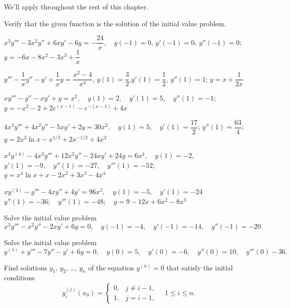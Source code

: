 We'll apply  
throughout the rest of this chapter.

\exercises

\begin{exerciselist}

\item\label{exer:9.1.1}Verify that the given function is the solution of the initial
value problem.

\begin{alist}
\item $ x^3y'''-3x^2y''+6xy'-6y=-\dfrac{24}{x}, \quad  y(-1)=0$,
$y'(-1)=0$, \quad  $y''(-1)=0$; $y=-6x-8x^2-3x^3+\dfrac{1}{x}$
\item $y'''-\dfrac{1}{x}y''-y'+\dfrac{1}{x}y=\dfrac{x^2-4}{x^4}$, \quad
$y(1)=\dfrac{3}{2}$,\quad $y'(1)=\dfrac{1}{2}$, $ y''(1)=1$;
$y=x+\dfrac{1}{2x}$
\item $xy'''-y''-xy'+y=x^2, \quad  y(1)=2,\quad y'(1)=5,\quad y''(1)=-1$;
$y=-x^2-2+2e^{(x-1)}-e^{-(x-1)}+4x$
\item $4x^3y'''+4x^2y''-5xy'+2y=30x^2, \quad
y(1)=5,\quad y'(1)=\dfrac{17}{2}$;
$y''(1)=\dfrac{63}{4}$;\quad $y=2x^2\ln x-x^{1/2}+2x^{-1/2}+4x^2$
\item $x^4y^{(4)}-4x^3y'''+12x^2y''-24xy'+24y=6x^4, \quad  y(1)=-2$,
$y'(1)=-9, \quad  y''(1)=-27,\quad y'''(1)=-52$;
$y=x^4\ln x+x-2x^2+3x^3-4x^4$
\item $xy^{(4)}-y'''-4xy''+4y'=96x^2, \quad  y(1)=-5,\quad y'(1)=-24$
$y''(1)=-36; \quad   y'''(1)=-48;\quad y=9-12x+6x^2-8x^3$
\end{alist}

\item\label{exer:9.1.2}Solve the initial value problem
\[
x^3y'''-x^2 y''-2xy'+6y=0,
\quad   y(-1)=-4, \quad   y'(-1)=-14,\quad   y''(-1)=-20.
\]


\item\label{exer:9.1.3}Solve the initial value problem
\[
y^{(4)}+y'''-7y''-y'+6y=0,
\quad   y(0)=5,\quad   y'(0)=-6,\quad   y''(0)=10,\quad   y'''(0)-36.
\]


\item\label{exer:9.1.4}Find solutions $y_1$, $y_2$, \dots, $y_n$ of the equation $y^{(n)}=0$
that satisfy the initial conditions
\[
y_i^{(j)}(x_0)=\begin{cases}
0,&j\ne i-1,\\
1,&j=i-1,\end{cases}\quad 1\le i\le n.
\]


\end{exerciselist}
